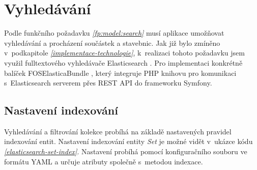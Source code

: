 \section{Vyhledávání}
Podle funkčního požadavku \emph{\ref{fp:model:search}} musí aplikace umožňovat vyhledávání a procházení součástek a stavebnic. Jak již bylo zmíněno v~podkapitole \emph{\ref{implementace-technologie}}, k~realizaci tohoto požadavku jsem využil fulltextového vyhledávače Elasticsearch \autocite{elasticsearch}. Pro implementaci konkrétně balíček FOSElasticaBundle \autocite{foselastica}, který integruje PHP knihovu pro komunikaci s~Elasticsearch serverem přes \gls{REST} API do frameworku Symfony.


\subsection{Nastavení indexování}
Vyhledávání a filtrování kolekce probíhá na základě nastavených pravidel indexování entit. Nastavení indexování entity \textit{Set} je 
možné vidět v~ukázce kódu \emph{\ref{elasticsearch-set-index}}. Nastavení probíhá pomocí konfiguračního souboru ve formátu \gls{YAML} a určuje atributy společně s~metodou indexace.

